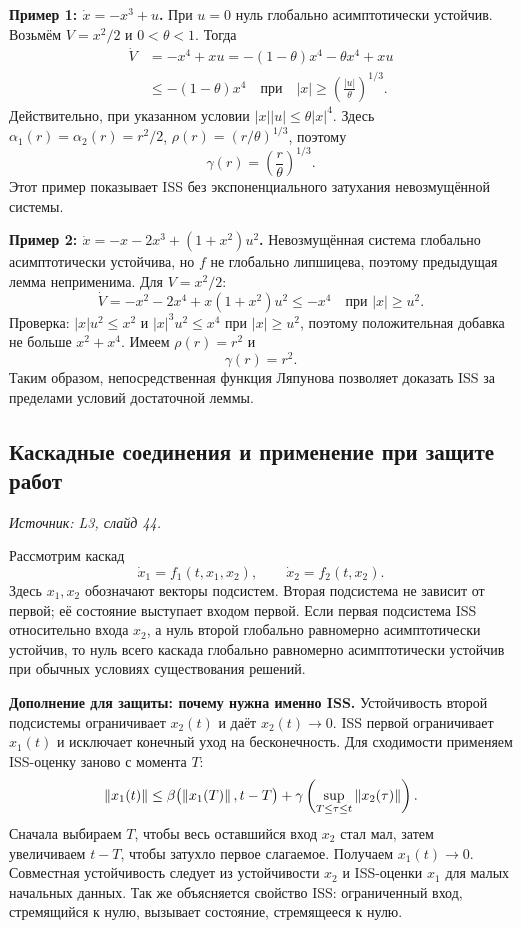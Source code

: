 \textbf{Пример 1: $\dot x=-x^3+u$.}
При $u=0$ нуль глобально асимптотически устойчив.
Возьмём $V=x^2/2$ и $0<\theta<1$. Тогда
\[
 \begin{aligned}
 \dot V&=-x^4+xu
       =-(1-\theta)x^4-\theta x^4+xu\\
       &\le-(1-\theta)x^4
       \quad\text{при}\quad
       |x|\ge\left(\frac{|u|}{\theta}\right)^{1/3}.
 \end{aligned}
\]
Действительно, при указанном условии
$|x||u|\le\theta|x|^4$.
Здесь $\alpha_1(r)=\alpha_2(r)=r^2/2$,
$\rho(r)=(r/\theta)^{1/3}$, поэтому
\[
 \gamma(r)=\left(\frac{r}{\theta}\right)^{1/3}.
\]
Этот пример показывает ISS без экспоненциального затухания
невозмущённой системы.

\textbf{Пример 2: $\dot x=-x-2x^3+(1+x^2)u^2$.}
Невозмущённая система глобально асимптотически устойчива,
но $f$ не глобально липшицева, поэтому предыдущая лемма
неприменима. Для $V=x^2/2$:
\[
 \dot V=-x^2-2x^4+x(1+x^2)u^2
       \le-x^4\quad\text{при }|x|\ge u^2.
\]
Проверка: $|x|u^2\le x^2$ и $|x|^3u^2\le x^4$
при $|x|\ge u^2$, поэтому положительная добавка
не больше $x^2+x^4$.
Имеем $\rho(r)=r^2$ и
\[
 \gamma(r)=r^2.
\]
Таким образом, непосредственная функция Ляпунова позволяет
доказать ISS за пределами условий достаточной леммы.

\subsection{Каскадные соединения и применение при защите работ}
\label{subsec:stability-cascade}
\noindent\textit{Источник: L3, слайд 44.}

Рассмотрим каскад
\[
 \dot x_1=f_1(t,x_1,x_2),\qquad
 \dot x_2=f_2(t,x_2).
\]
Здесь $x_1,x_2$ обозначают векторы подсистем.
Вторая подсистема не зависит от первой; её состояние выступает
входом первой.
Если первая подсистема ISS относительно входа $x_2$, а нуль
второй глобально равномерно асимптотически устойчив, то нуль
всего каскада глобально равномерно асимптотически устойчив
при обычных условиях существования решений.

\textbf{Дополнение для защиты: почему нужна именно ISS.}
Устойчивость второй подсистемы ограничивает $x_2(t)$ и даёт
$x_2(t)\to0$. ISS первой ограничивает $x_1(t)$ и исключает
конечный уход на бесконечность. Для сходимости применяем
ISS-оценку заново с момента $T$:
\[
 \left\lVert x_1(t)\right\rVert\le
 \beta\bigl(\left\lVert x_1(T)\right\rVert,t-T\bigr)
 +\gamma\left(\sup_{T\le\tau\le t}\left\lVert x_2(\tau)\right\rVert\right).
\]
Сначала выбираем $T$, чтобы весь оставшийся вход $x_2$ стал мал,
затем увеличиваем $t-T$, чтобы затухло первое слагаемое.
Получаем $x_1(t)\to0$. Совместная устойчивость следует из
устойчивости $x_2$ и ISS-оценки $x_1$ для малых начальных данных.
Так же объясняется свойство ISS: ограниченный вход, стремящийся
к нулю, вызывает состояние, стремящееся к нулю.

